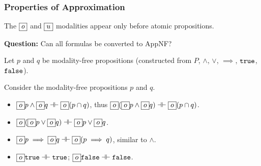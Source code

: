 \begin{frame}[fragile]
    \frametitle{Properties of Approximation}

\begin{definition} The $\boxed{o}$ and $\boxed{u}$ modalities appear only before atomic propositions.
\end{definition}

\textbf{Question:} Can all formulas be converted to AppNF?


Let $p$ and $q$ be modality-free propositions (constructed from $P$, $\land$, $\lor$, $\implies$, ${\tt true}$, ${\tt false}$).

\begin{lemma}[Overapproximation] Consider the modality-free propositions $p$ and $q$.
\begin{itemize}
    \item $\boxed{o} p \land \boxed{o} q \dashv\vdash \boxed{o}(p \cap q)$, thus $\boxed{o}(\boxed{o} p \land \boxed{o} q) \dashv\vdash \boxed{o}(p \cap q)$. 
    \item $\boxed{o}(\boxed{o} p \lor \boxed{o} q) \dashv\vdash \boxed{o} p \lor \boxed{o} q$.
    \item $\boxed{o} p \implies \boxed{o} q \dashv\vdash \boxed{o}(p \implies q)$, similar to $\land$.
    \item $\boxed{o} {\tt true} \dashv\vdash {\tt true}$; $\boxed{o} {\tt false} \dashv\vdash {\tt false}$.
\end{itemize}
\end{lemma}

\end{frame}

